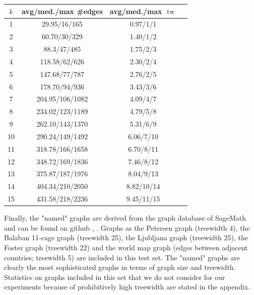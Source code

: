 \documentclass[11pt,a4paper]{article}
\DeclareMathOperator{\tw}{tw}
\begin{document}
\begin{center}
\begin{table}[h!]
\centering
\begin{tabular}{|c|c|c|c|}
\hline
$k$ & avg/med./max \#edges & avg/med./max $\tw$ \\
\hline \hline
1 & 29.95/16/165 & 0.97/1/1 \\
\hline
2 & 60.70/30/329 & 1.40/1/2 \\
\hline
3 & 88.3/47/485 & 1.75/2/3 \\
\hline
4 & 118.58/62/626 & 2.30/2/4 \\
\hline
5 & 147.68/77/787 & 2.76/2/5 \\
\hline
6 & 178.70/94/936 & 3.43/3/6 \\
\hline
7 & 204.95/106/1082 & 4.09/4/7 \\
\hline
8 & 234.02/123/1189 & 4.79/5/8 \\
\hline
9 & 262.10/143/1370 & 5.31/6/9 \\
\hline
10 & 290.24/149/1492 & 6.06/7/10 \\
\hline
11 & 318.78/166/1658 & 6.70/8/11 \\
\hline
12 & 348.72/169/1836 & 7.46/8/12 \\
\hline
13 & 375.87/187/1976 & 8.04/9/13 \\
\hline
14 & 404.34/210/2050 & 8.82/10/14 \\
\hline
15 & 431.58/218/2236 & 9.45/11/15 \\
\hline
\end{tabular}
\end{table}
\end{center}

\vspace*{-5mm}

Finally, the "named" graphs are derived from the graph database of SageMath and can be found on github \cite{sage}, \cite{named_graphs}. Graphs as the Petersen graph (treewidth 4), the Balaban 11-cage graph (treewidth 25), the Ljubljana graph (treewidth 25), the Foster graph (treewidth 22) and the world map graph (edges between adjacent countries; treewidth 5) are included in this test set. The "named" graphs are clearly the most sophisticated graphs in terms of graph size and treewidth. Statistics on graphs included in this set that we do not consider for our experiments because of prohibitively high treewidth are stated in the appendix. \\
\end{document}
